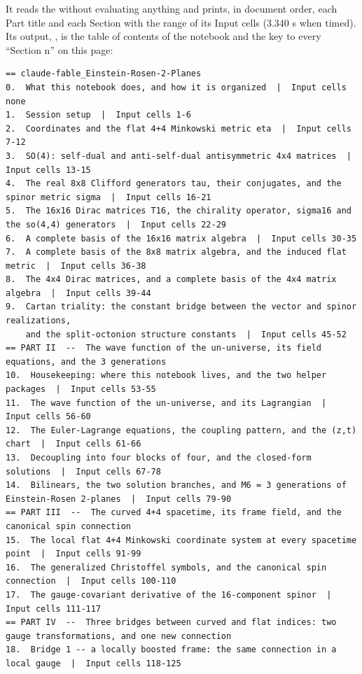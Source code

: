It reads the  without evaluating anything and prints, in document order, each Part title and each Section with the range of its Input cells (3.340 s when timed). Its output, , is the table of contents of the notebook and the key to every ``Section n'' on this page:

\begin{Verbatim}
== claude-fable_Einstein-Rosen-2-Planes
0.  What this notebook does, and how it is organized  |  Input cells none
1.  Session setup  |  Input cells 1-6
2.  Coordinates and the flat 4+4 Minkowski metric eta  |  Input cells 7-12
3.  SO(4): self-dual and anti-self-dual antisymmetric 4x4 matrices  |  Input cells 13-15
4.  The real 8x8 Clifford generators tau, their conjugates, and the spinor metric sigma  |  Input cells 16-21
5.  The 16x16 Dirac matrices T16, the chirality operator, sigma16 and the so(4,4) generators  |  Input cells 22-29
6.  A complete basis of the 16x16 matrix algebra  |  Input cells 30-35
7.  A complete basis of the 8x8 matrix algebra, and the induced flat metric  |  Input cells 36-38
8.  The 4x4 Dirac matrices, and a complete basis of the 4x4 matrix algebra  |  Input cells 39-44
9.  Cartan triality: the constant bridge between the vector and spinor realizations,
    and the split-octonion structure constants  |  Input cells 45-52
== PART II  --  The wave function of the un-universe, its field equations, and the 3 generations
10.  Housekeeping: where this notebook lives, and the two helper packages  |  Input cells 53-55
11.  The wave function of the un-universe, and its Lagrangian  |  Input cells 56-60
12.  The Euler-Lagrange equations, the coupling pattern, and the (z,t) chart  |  Input cells 61-66
13.  Decoupling into four blocks of four, and the closed-form solutions  |  Input cells 67-78
14.  Bilinears, the two solution branches, and M6 = 3 generations of Einstein-Rosen 2-planes  |  Input cells 79-90
== PART III  --  The curved 4+4 spacetime, its frame field, and the canonical spin connection
15.  The local flat 4+4 Minkowski coordinate system at every spacetime point  |  Input cells 91-99
16.  The generalized Christoffel symbols, and the canonical spin connection  |  Input cells 100-110
17.  The gauge-covariant derivative of the 16-component spinor  |  Input cells 111-117
== PART IV  --  Three bridges between curved and flat indices: two gauge transformations, and one new connection
18.  Bridge 1 -- a locally boosted frame: the same connection in a local gauge  |  Input cells 118-125

\end{Verbatim}
